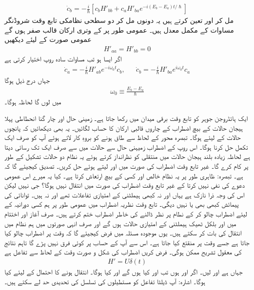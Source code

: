 \begin{align}
	\dot{c}_b=-\frac{i}{\hslash}\left[c_bH'_{bb}+c_aH'_{ba}e^{-i(E_b-E_a)t/\hslash}\right]
\end{align}
 مل کر  اور  تعین کرتے ہیں یہ دونوں مل کر دو سطحی نظامکی تابع وقت شروڈنگر مساوات کے مکمل معدل ہیں۔ عمومی طور پر  کے وتری ارکان قالب صفر ہوں گے عمومی صورت کے لیئے  دیکھیں
\begin{align}
	H'_{aa}=H'_{bb}=0
\end{align}
اگر ایسا ہو تب مساوات سادہ روپ اختیار کرتی ہے
\begin{align}
	\dot{c}_a=-\frac{i}{\hslash}H'_{ab}e^{-i\omega_0t}c_b,&&\dot{c}_b=-\frac{i}{\hslash}H'_{ba}e^{i\omega_0t}c_a
\end{align}
جہاں درج ذیل ہوگا
\begin{align}
	\omega_0\equiv\frac{E_b-E_a}{\hslash}
\end{align}
میں  لوں گا لحاظہ  ہوگا۔


ایک ہائڈروجن جوہر کو تابع وقت برقی میدان  میں رکھا جاتا ہے۔ زمینی حال  اور چار گنا انحطاطی پہلا ہیجان حالات  کے بیچ اضطراب  کے چاروں قالبی ارکان  کا حساب لگائیں۔ یہ بھی دیکھائیں کہ پانچوں حالات کے لیئے  ہوگا۔ تبصرہ محور  کے لحاظ سے طاق ہونے کو بروہِ کار لاتے ہوئے آپ کو صرف ایک تکمل حل کرنا ہوگا۔ اس روپ کے اضطراب زمیہنی حال سے  حالات میں سے صرف ایک تک رسائی دیتا ہے لحاظہ زیادہ بلند ہیجان حالات میں منتقلی کو نظرانداز کرتے ہوئے یہ نظام دو حالات تشکیل  کے طور پر کام کرے گا۔
غیر تابع وقت اضطراب کی صورت میں  اور  لیتے ہوئے  حل کریں۔ تصدیق کیجیئے گا کہ  ہے۔ تبصرہ: ظاہری طور پر یہ نظام خالص  اور کسی  کے بیچ ارتعاش کرتا ہے۔ کیا یہ میرے اس عمومی دعوے کی نفی نہیں کرتا کے غیر تابع وقت اضطراب کی صورت میں انتقال نہیں ہوگا؟ جی نہیں لیکن اس کی وجہ ذرا نازک ہے یہاں  اور  نہ کبھی ہیملٹنی کے امتیازی تفاعلات تھے اور نہ ہیں۔ توانائی کی پیمائش کبھی بھی  یا  نہیں دیگی۔ تابع وقت نظریہ اضطراب میں عمومی طور پر ہم کسی دورانیہ کے لیئے اضطراب چالو کر کے نطام پر نظر ڈالنے کی خاطر اضطراب ختم کرتے ہیں۔ صرف آغاز اور اختتام میں  اور  بلکل ٹھیک ہیملٹنی کے امتیازی حالات ہوں گے اور صرف انہی صورتوں میں ہم نظام میں انتقال کی بات کر سکتے ہیں۔ یوں موجودہ مسئلہ میں فرض کیجیئے گا کہ وقت  پر اضطراب چالو کیا جاتا ہے جسے وقت  پر منقتع کیا جاتا ہے۔ اس سے آپ کے حساب پر کوئی فرق نہیں پڑے گا تاہم نتائج کی معقول تشریح ممکن ہوگی۔
فرض کریں اضطراب کی شکل و صورت وقت کے لحاظ سے  تفاعل ہے
\begin{align*}
	H'=U\delta(t)
\end{align*}
جہاں  ہے اور  لیں۔ اگر  اور  ہوں تب  اور  کیا ہوں گے اور کیا  ہوگا۔ انتقال ہونے کا احتمال  کے لیئے  کیا ہوگا۔ اشارہ: آپ ڈیلٹا تفاعل کو مستطیلوں کی تسلسل کی تحدیدی حد لے سکتے ہیں۔


